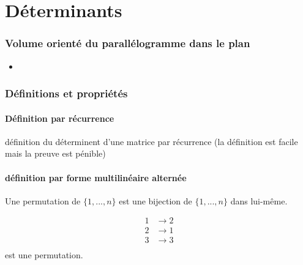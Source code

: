 \documentclass[../main.tex]{subfile}
\begin{document}
\part{Déterminants}
\section{Volume orienté du parallélogramme dans le plan}


\begin{prop}
\begin{itemize}	
	\item 
\end{itemize}
\end{prop}


\section{Définitions et propriétés}
\subsection{Définition par récurrence}
\begin{defi}
	définition du déterminent d'une matrice par récurrence (la définition est facile mais la preuve est pénible)
\end{defi}

\subsection{définition par forme multilinéaire alternée}
\begin{rap}
	Une permutation de $\{1, ..., n\}$ est une bijection de $\{1, ..., n\}$ dans lui-même.
\end{rap}

\begin{ex}
	$$
\begin{aligned}
	1 &\to 2\\
	2 &\to 1\\
	3 &\to 3\\
\end{aligned}
	$$
	est une permutation.
\end{ex}
\end{document}
